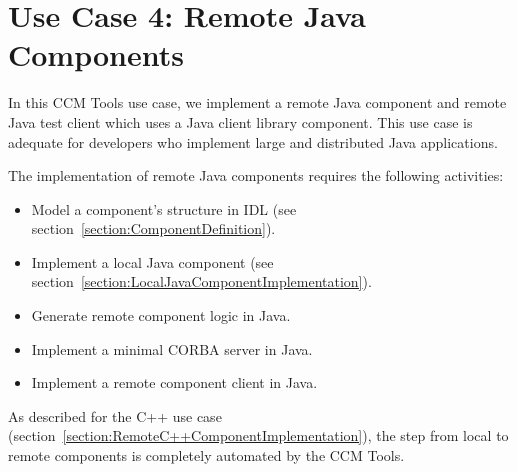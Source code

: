 \section{Use Case 4: Remote Java Components}
\label{section:RemoteJavaComponentImplementation}

In this CCM Tools use case, we implement a remote Java component and remote Java
test client which uses a Java client library component.
This use case is adequate for developers who implement large and distributed
Java applications.
 
\vspace{3mm}
The implementation of remote Java components requires the following activities:
\begin{itemize}
	\item Model a component's structure in IDL 
			(see section~\ref{section:ComponentDefinition}). 
	\item Implement a local Java component (see section~\ref{section:LocalJavaComponentImplementation}).
	\item Generate remote component logic in Java.
	\item Implement a minimal CORBA server in Java.
	\item Implement a remote component client in Java.
\end{itemize}

As described for the C++ use case
(section~\ref{section:RemoteC++ComponentImplementation}), the
step from local to remote components is completely automated by the CCM
Tools.



\newpage